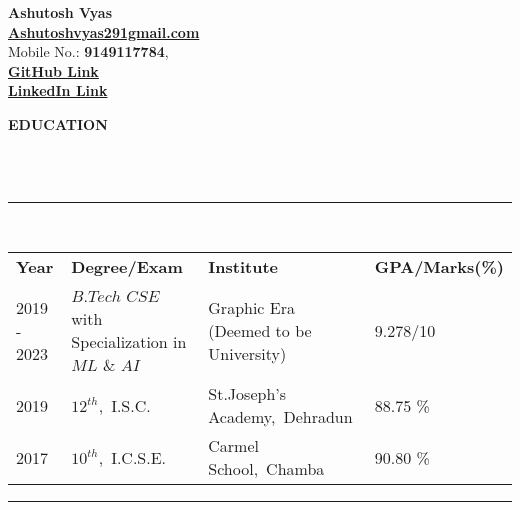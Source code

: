 \documentclass[a4paper,10pt]{article}
\newcommand{\lsep}{-0.5cm}
\newcommand{\resheading}[1]{{\small \colorbox{mygrey}{\begin{minipage}{0.98\textwidth}{\textbf{#1 \vphantom{p\^{E}}}}\end{minipage}}}}
\begin{document}
\textbf{Ashutosh Vyas} \\
\indent \textbf{\url{Ashutoshvyas291gmail.com}} \\
\indent Mobile No.: \textbf{9149117784}, \ \\
\indent \href{http://github.com/Ash20vyas}{\textbf{GitHub Link}}\\
\indent \href{https://www.linkedin.com/in/ashutoshvyas291}{\textbf{LinkedIn Link}}\\

\resheading{\textbf{EDUCATION} }\\[\lsep]
\\
\indent \rule{7.34in}{0.4pt}\\
\indent \begin{tabular}{ l @{\hskip 0.17in} l @{\hskip 0.17in} l @{\hskip 0.17in} l @{\hskip 0.17in} }
\noindent \textbf{Year} & \textbf{Degree/Exam} & \textbf{Institute} & \textbf{GPA/Marks(\%)}\\
2019 - 2023 & $B.Tech$ $CSE$ with Specialization in $ML$ $\&$ $AI$ & Graphic Era (Deemed to be University) & 9.278/10 \\
2019 & $12^{th}$,\ I.S.C. & St.Joseph's Academy,\ Dehradun & 88.75 \% \\
2017 & $10^{th}$,\ I.C.S.E. & Carmel School,\ Chamba & 90.80 \%\\

\end{tabular}
\indent \rule{7.34in}{0.4pt}
\end{document}
